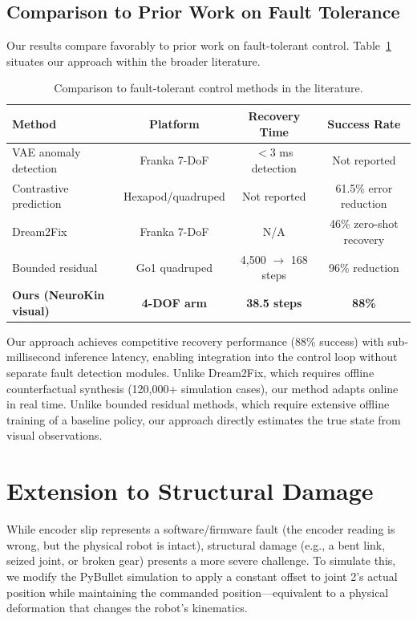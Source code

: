 \documentclass[12pt,a4paper,oneside]{report}
\begin{document}
\subsection{Comparison to Prior Work on Fault Tolerance}

Our results compare favorably to prior work on fault-tolerant control. Table~\ref{tab:comparison_fault} situates our approach within the broader literature.

\begin{table}[H]
\centering
\caption{Comparison to fault-tolerant control methods in the literature.}
\label{tab:comparison_fault}
\begin{tabular}{lccc}
\toprule
\textbf{Method} & \textbf{Platform} & \textbf{Recovery Time} & \textbf{Success Rate} \\
\midrule
VAE anomaly detection \cite{grambow2026anomaly} & Franka 7-DoF & $<3$ ms detection & Not reported \\
Contrastive prediction \cite{fu2025contrastive} & Hexapod/quadruped & Not reported & 61.5\% error reduction \\
Dream2Fix \cite{li2025dream2fix} & Franka 7-DoF & N/A & 46\% zero-shot recovery \\
Bounded residual \cite{jayasinghe2026residual} & Go1 quadruped & 4,500 $\rightarrow$ 168 steps & 96\% reduction \\
\textbf{Ours (NeuroKin visual)} & \textbf{4-DOF arm} & \textbf{38.5 steps} & \textbf{88\%} \\
\bottomrule
\end{tabular}
\end{table}

Our approach achieves competitive recovery performance (88\% success) with sub-millisecond inference latency, enabling integration into the control loop without separate fault detection modules. Unlike Dream2Fix, which requires offline counterfactual synthesis (120,000+ simulation cases), our method adapts online in real time. Unlike bounded residual methods, which require extensive offline training of a baseline policy, our approach directly estimates the true state from visual observations.

\section{Extension to Structural Damage}

While encoder slip represents a software/firmware fault (the encoder reading is wrong, but the physical robot is intact), structural damage (e.g., a bent link, seized joint, or broken gear) presents a more severe challenge. To simulate this, we modify the PyBullet simulation to apply a constant offset to joint 2's actual position while maintaining the commanded position—equivalent to a physical deformation that changes the robot's kinematics.
\end{document}
